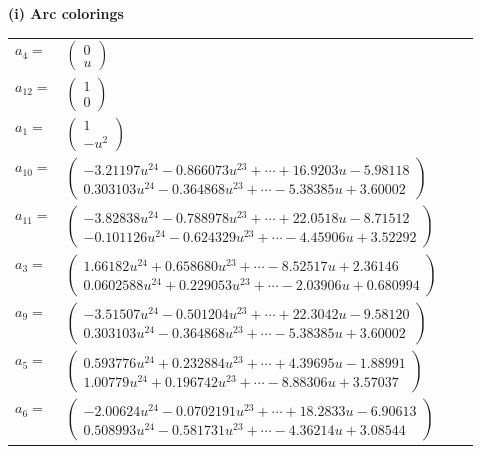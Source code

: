 \documentclass[1p]{elsarticle_modified}
\theoremstyle{definition}
\begin{document}
\flushleft \textbf{(i) Arc colorings}\\
\begin{tabular}{m{7pt} m{180pt} m{7pt} m{180pt} }
\flushright $a_{4}=$&$\begin{pmatrix}0\\u\end{pmatrix}$ \\
\flushright $a_{12}=$&$\begin{pmatrix}1\\0\end{pmatrix}$ \\
\flushright $a_{1}=$&$\begin{pmatrix}1\\- u^2\end{pmatrix}$ \\
\flushright $a_{10}=$&$\begin{pmatrix}-3.21197 u^{24}-0.866073 u^{23}+\cdots+16.9203 u-5.98118\\0.303103 u^{24}-0.364868 u^{23}+\cdots-5.38385 u+3.60002\end{pmatrix}$ \\
\flushright $a_{11}=$&$\begin{pmatrix}-3.82838 u^{24}-0.788978 u^{23}+\cdots+22.0518 u-8.71512\\-0.101126 u^{24}-0.624329 u^{23}+\cdots-4.45906 u+3.52292\end{pmatrix}$ \\
\flushright $a_{3}=$&$\begin{pmatrix}1.66182 u^{24}+0.658680 u^{23}+\cdots-8.52517 u+2.36146\\0.0602588 u^{24}+0.229053 u^{23}+\cdots-2.03906 u+0.680994\end{pmatrix}$ \\
\flushright $a_{9}=$&$\begin{pmatrix}-3.51507 u^{24}-0.501204 u^{23}+\cdots+22.3042 u-9.58120\\0.303103 u^{24}-0.364868 u^{23}+\cdots-5.38385 u+3.60002\end{pmatrix}$ \\
\flushright $a_{5}=$&$\begin{pmatrix}0.593776 u^{24}+0.232884 u^{23}+\cdots+4.39695 u-1.88991\\1.00779 u^{24}+0.196742 u^{23}+\cdots-8.88306 u+3.57037\end{pmatrix}$ \\
\flushright $a_{6}=$&$\begin{pmatrix}-2.00624 u^{24}-0.0702191 u^{23}+\cdots+18.2833 u-6.90613\\0.508993 u^{24}-0.581731 u^{23}+\cdots-4.36214 u+3.08544\end{pmatrix}$ \\

\end{tabular}
\end{document}
